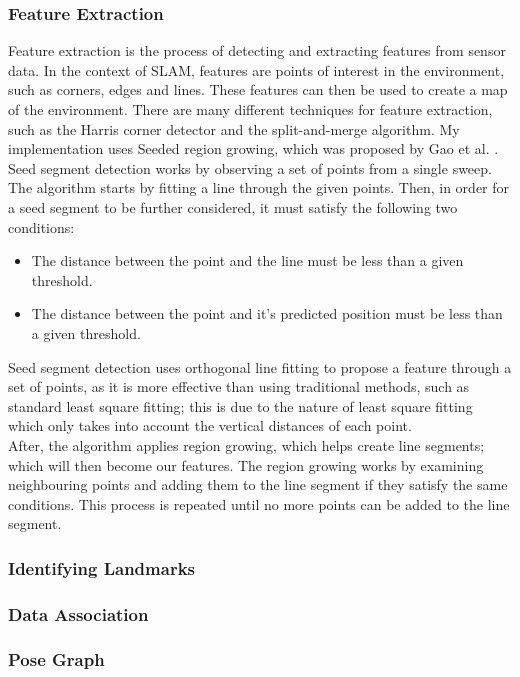 \documentclass[12pt]{article}
\begin{document}
\subsubsection{Feature Extraction}
Feature extraction is the process of detecting and extracting features from sensor data. In the context of SLAM, features
are points of interest in the environment, such as corners, edges and lines. These features can then be used to create a map
of the environment. There are many different techniques for feature extraction, such as the Harris corner detector and the
split-and-merge algorithm. My implementation uses Seeded region growing, which was proposed by Gao et al.
\cite{seeded_region_growing}.\\
Seed segment detection works by observing a set of points from a single sweep. The algorithm starts by fitting a line through
the given points. Then, in order for a seed segment to be further considered, it must satisfy the following two conditions:
\begin{itemize}
    \item The distance between the point and the line must be less than a given threshold.
    \item The distance between the point and it's predicted position must be less than a given threshold.
\end{itemize}
Seed segment detection uses orthogonal line fitting to propose a feature through a set of points, as it is more effective
than using traditional methods, such as standard least square fitting; this is due to the nature of least square fitting
which only takes into account the vertical distances of each point.\\
After, the algorithm applies region growing, which helps create line segments; which will then become our features. The
region growing works by examining neighbouring points and adding them to the line segment if they satisfy the same conditions.
This process is repeated until no more points can be added to the line segment.\\

\subsubsection{Identifying Landmarks}
\subsubsection{Data Association}
\subsubsection{Pose Graph}
\end{document}
